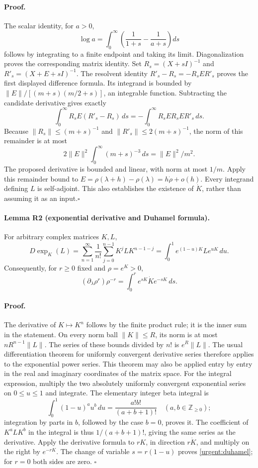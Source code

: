 \paragraph{Proof.}
The scalar identity, for $a>0$,
\[
 \log a=\int_0^\infty\left(\frac1{1+s}-\frac1{a+s}\right)ds
\]
follows by integrating to a finite endpoint and taking its limit.
Diagonalization proves the corresponding matrix identity. Set
$R_s=(X+sI)^{-1}$ and $R'_s=(X+E+sI)^{-1}$. The resolvent identity
$R'_s-R_s=-R_sER'_s$ proves the first displayed difference formula.
Its integrand is bounded by
$\|E\|/[(m+s)(m/2+s)]$, an integrable function.
Subtracting the candidate derivative gives exactly
\[
 \int_0^\infty R_sE(R'_s-R_s)\,ds
 =-\int_0^\infty R_sER_sER'_s\,ds.
\]
Because $\|R_s\|\leq(m+s)^{-1}$ and
$\|R'_s\|\leq2(m+s)^{-1}$, the norm of this remainder is at most
\[
 2\|E\|^2\int_0^\infty(m+s)^{-3}\,ds=\|E\|^2/m^2.
\]
The proposed derivative is bounded and linear, with norm at most $1/m$.
Apply this remainder bound to
$E=\rho(\lambda+h)-\rho(\lambda)=h\dot\rho+o(h)$.
Every integrand defining $L$ is self-adjoint. This also establishes the
existence of $\dot K$, rather than assuming it as an input.\hfill$\square$

\paragraph{Lemma R2 (exponential derivative and Duhamel formula).}
For arbitrary complex matrices $K,L$,
\[
 D\exp_K(L)
 =\sum_{n=1}^\infty\frac1{n!}\sum_{j=0}^{n-1}K^jLK^{n-1-j}
 =\int_0^1e^{(1-u)K}Le^{uK}\,du.
\]
Consequently, for $r\geq0$ fixed and $\rho=e^K>0$,
\begin{equation}
 (\partial_\lambda\rho^r)\rho^{-r}
 =\int_0^r e^{sK}\dot K e^{-sK}\,ds.
 \label{urgent:duhamel}
\end{equation}

\paragraph{Proof.}
The derivative of $K\mapsto K^n$ follows by the finite product rule;
it is the inner sum in the statement. On every norm ball
$\|K\|\leq R$, its norm is at most $nR^{n-1}\|L\|$.
The series of these bounds divided by $n!$ is $e^R\|L\|$.
The usual differentiation theorem for uniformly convergent derivative
series therefore applies to the exponential power series. This theorem
may also be applied entry by entry in the real and imaginary coordinates
of the matrix space.
For the integral expression, multiply the two absolutely uniformly
convergent exponential series on $0\leq u\leq1$ and integrate.
The elementary integer beta integral is
\[
 \int_0^1(1-u)^a u^b\,du=\frac{a!b!}{(a+b+1)!}
 \quad(a,b\in\mathbb Z_{\geq0});
\]
integration by parts in $b$, followed by the case $b=0$, proves it.
The coefficient of $K^aLK^b$ in the integral is thus
$1/(a+b+1)!$, giving the same series as the derivative.
Apply the derivative formula to $rK$, in direction $r\dot K$, and
multiply on the right by $e^{-rK}$. The change of variable
$s=r(1-u)$ proves \eqref{urgent:duhamel}; for $r=0$ both sides are zero.
\hfill$\square$

